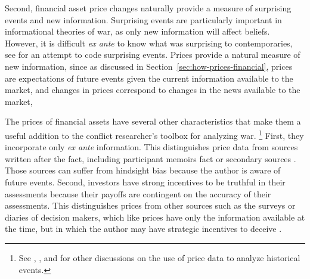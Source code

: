 Second, financial asset price changes naturally provide a measure of surprising events and new information.
Surprising events are particularly important in informational theories of war, as only new information will affect beliefs.
However,  it is difficult \textit{ex ante} to know what was surprising to contemporaries, see \textcite{Shirkey2009a} for an attempt to code surprising events.
Prices provide a natural measure of new information, since as discussed in Section~\ref{sec:how-prices-financial}, prices are  expectations of future events given the current information available to the market, and changes in prices correspond to changes in the news available to the market, 

The prices of financial assets have several other characteristics that make them a useful addition to the conflict researcher's toolbox for analyzing war.
\footnote{See \textcite{WillardGuinnaneEtAl1996}, \textcite{north2000introd}, and \textcite{FreyKucher2000} for other  discussions on the use of price data to analyze historical events.} %
First, they incorporate only \textit{ex ante} information.
This distinguishes price data from sources written after the fact, including participant memoirs fact or secondary sources \parencites[1001]{WillardGuinnaneEtAl1996}[][188]{FreyKucher2000a}.
Those sources can suffer from hindsight bias because the author is aware of future events.
Second, investors have strong incentives to be truthful in their assessments because their payoffs are contingent on the accuracy of their assessments.
This distinguishes prices from other sources such as the surveys or diaries of decision makers, which like prices have only the information available at the time, but in which the author may have strategic incentives to deceive \parencite[57]{Reiter2009}.%
